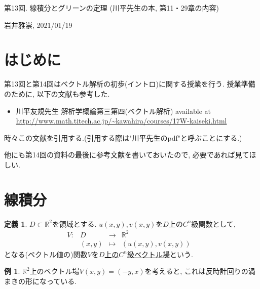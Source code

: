 \documentclass[dvipdfmx,a4paper,11pt]{article}
\newcommand{\R}{\mathbb{R}}
\theoremstyle{definition}
\newtheorem{dfn}[thm]{定義}
\newtheorem{exa}[thm]{例}
\begin{document}
\begin{center}
{\Large 第13回. 線積分とグリーンの定理  (川平先生の本, 第11・29章の内容)}
\end{center}

\begin{flushright}
 岩井雅崇, 2021/01/19
\end{flushright}


\section{はじめに}
第13回と第14回はベクトル解析の初歩(イントロ)に関する授業を行う.
授業準備のために, 以下の文献も参考した.
\begin{itemize}
\item 川平友規先生 解析学概論第三第四(ベクトル解析) available at \url{http://www.math.titech.ac.jp/~kawahira/courses/17W-kaiseki.html}
\end{itemize}
時々この文献を引用する.(引用する際は"川平先生のpdf"と呼ぶことにする.)

他にも第14回の資料の最後に参考文献を書いておいたので, 必要であれば見てほしい.

\section{線積分}


 \begin{tcolorbox}[
    colback = white,
    colframe = green!35!black,
    fonttitle = \bfseries,
    breakable = true]
    \begin{dfn}
    
  $D \subset \R^2$を領域とする.
  $u(x,y), v(x,y)$を$D$上の$C^n$級関数として, 
 $$
\begin{array}{ccccc}
V: &D & \rightarrow & \R^2 & \\
&(x,y) & \longmapsto & (u(x,y), v(x,y))&
\end{array}
$$
となる(ベクトル値の)関数$V$を\underline{$D$上の$C^n$級ベクトル場}という. 

 \end{dfn}
 \end{tcolorbox}
 
 \begin{exa}
 $\R^2$上のベクトル場$V(x,y)=(-y,x)$を考えると, これは反時計回りの渦まきの形になっている.
 \end{exa}
 
\end{document}
